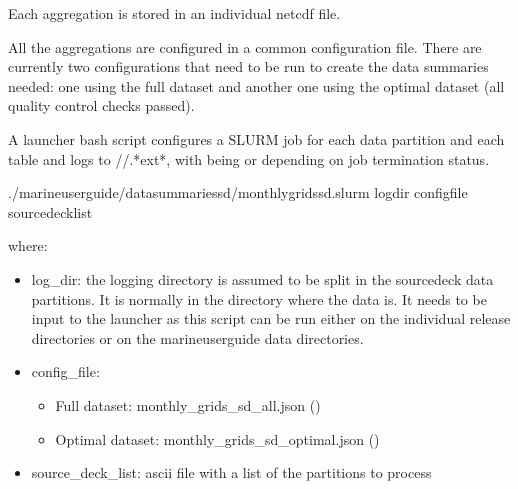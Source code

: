 \documentclass[letterpaper,10pt,english]{sphinxmanual}
\begin{document}
Each aggregation is stored in an individual netcdf file.

All the aggregations are configured in a common configuration file. There are
currently two configurations that need to be run to create the data summaries
needed: one using the full dataset and another one using the optimal dataset
(all quality control checks passed).

A launcher bash script configures a SLURM job for each  data partition
and each table and logs to //\sphinxhyphen{}.*ext*, with
 being  or  depending on job termination status.

\begin{sphinxVerbatim}[commandchars=\\\{\}]
./marine\PYGZhy{}user\PYGZhy{}guide/data\PYGZus{}summaries\PYGZus{}sd/monthly\PYGZus{}grids\PYGZus{}sd.slurm log\PYGZus{}dir config\PYGZus{}file source\PYGZus{}deck\PYGZus{}list
\end{sphinxVerbatim}

where:
\begin{itemize}
\item {} 
log\_dir: the logging directory is assumed to be split in the source\sphinxhyphen{}deck data
partitions. It is normally  in the directory where the data is.
It needs to be input to the launcher as this script can be run either on the
individual release directories or on the marine\sphinxhyphen{}user\sphinxhyphen{}guide data directories.

\item {} 
config\_file:
\begin{itemize}
\item {} 
Full dataset: monthly\_grids\_sd\_all.json ({\hyperref[\detokenize{index:monthly-grids-sd-all}]{}})

\item {} 
Optimal dataset: monthly\_grids\_sd\_optimal.json ({\hyperref[\detokenize{index:monthly-grids-sd-optimal}]{}})

\end{itemize}

\item {} 
source\_deck\_list: ascii file with a list of the  partitions to process

\end{itemize}
\end{document}
